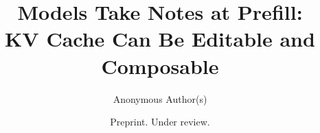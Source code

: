 \documentclass[11pt]{article}
\title{Models Take Notes at Prefill:\\ KV Cache Can Be Editable and Composable}
\author{Anonymous Author(s)}
\date{Preprint. Under review.}
\begin{document}
\maketitle

\begin{abstract}

\end{abstract}
















\clearpage

\end{document}
